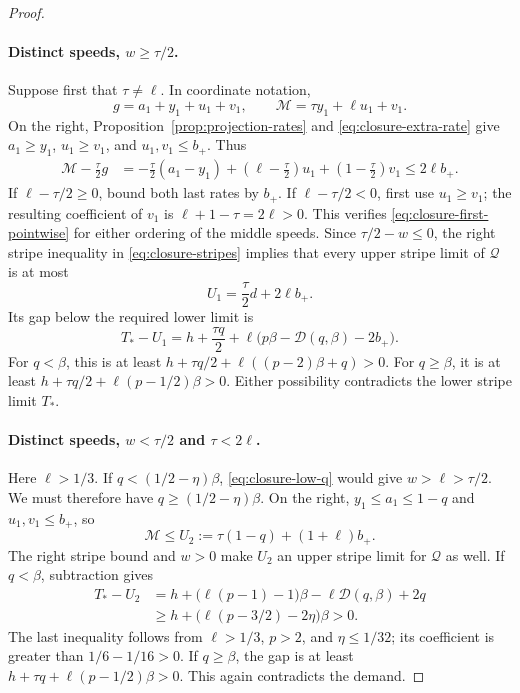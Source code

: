 \begin{proof}
\paragraph{Distinct speeds, \(w\ge\tau/2\).}
Suppose first that \(\tau\ne\ell\).  In coordinate notation,
\[
  g=a_1+y_1+u_1+v_1,
  \qquad \mathcal M=\tau y_1+\ell u_1+v_1.
\]
On the right, Proposition~\ref{prop:projection-rates} and
\eqref{eq:closure-extra-rate} give
\(a_1\ge y_1\), \(u_1\ge v_1\), and \(u_1,v_1\le b_+\).  Thus
\begin{align}
  \mathcal M-\frac\tau2g
   &=-\frac\tau2(a_1-y_1)
      +\left(\ell-\frac\tau2\right)u_1
      +\left(1-\frac\tau2\right)v_1
      \le2\ell b_+.
      \label{eq:closure-first-pointwise}
\end{align}
If \(\ell-\tau/2\ge0\), bound both last rates by \(b_+\).  If
\(\ell-\tau/2<0\), first use \(u_1\ge v_1\); the resulting coefficient
of \(v_1\) is \(\ell+1-\tau=2\ell>0\).  This verifies
\eqref{eq:closure-first-pointwise} for either ordering of the middle speeds.
Since \(\tau/2-w\le0\), the right stripe inequality in
\eqref{eq:closure-stripes} implies that every upper stripe limit of
\(\mathcal Q\) is at most
\[
  U_1=\frac\tau2d+2\ell b_+.
\]
Its gap below the required lower limit is
\[
  T_*-U_1
   =h+\frac{\tau q}{2}
      +\ell\bigl(p\beta-\mathcal D(q,\beta)-2b_+\bigr).
\]
For \(q<\beta\), this is at least
\(h+\tau q/2+\ell((p-2)\beta+q)>0\).  For \(q\ge\beta\), it is at
least \(h+\tau q/2+\ell(p-1/2)\beta>0\).  Either possibility
contradicts the lower stripe limit \(T_*\).

\paragraph{Distinct speeds, \(w<\tau/2\) and \(\tau<2\ell\).}
Here \(\ell>1/3\).  If \(q<(1/2-\eta)\beta\),
\eqref{eq:closure-low-q} would give \(w>\ell>\tau/2\).  We must
therefore have \(q\ge(1/2-\eta)\beta\).  On the right,
\(y_1\le a_1\le1-q\) and \(u_1,v_1\le b_+\), so
\[
  \mathcal M\le U_2:=\tau(1-q)+(1+\ell)b_+.
\]
The right stripe bound and \(w>0\) make \(U_2\) an upper stripe
limit for \(\mathcal Q\) as well.  If \(q<\beta\), subtraction gives
\begin{align*}
  T_*-U_2
    &=h+\bigl(\ell(p-1)-1\bigr)\beta
           -\ell\mathcal D(q,\beta)+2q\\
    &\ge h+\bigl(\ell(p-3/2)-2\eta\bigr)\beta>0.
\end{align*}
The last inequality follows from \(\ell>1/3\), \(p>2\), and
\(\eta\le1/32\); its coefficient is greater than
\(1/6-1/16>0\).  If \(q\ge\beta\), the gap is at least
\(h+\tau q+\ell(p-1/2)\beta>0\).  This again contradicts the demand.


\end{proof}
